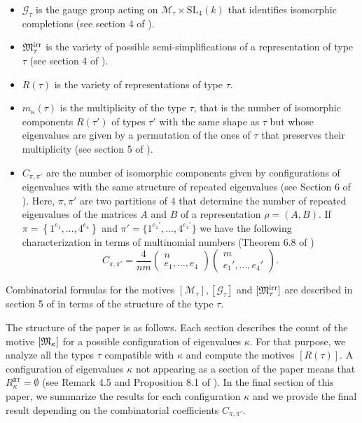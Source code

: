 \documentclass[10pt,a4paper]{amsart}
\begin{document}
\begin{itemize}
	\item $\mathcal{G}_{\tau}$ is the gauge group acting on $\mathcal{M}_{\tau} \times \mathrm{SL}_{4}(k)$ that identifies isomorphic completions (see section 4 of \cite{GPM}).
	\item ${\frak M}_{\tau}^{\textrm{irr}}$ is the variety of possible semi-simplifications of a representation of type $\tau$ (see section 4 of \cite{GPM}).
	\item $R(\tau)$ is the variety of representations of type $\tau$.
	\item $m_{\kappa}(\tau)$ is the multiplicity of the type $\tau$, that is the number of isomorphic components $R(\tau')$ of types $\tau'$ with the same shape as $\tau$ but whose eigenvalues are given by a permutation of the ones of $\tau$ that preserves their multiplicity (see section 5 of \cite{GPM}).
	\item $C_{\pi, \pi'}$ are the number of isomorphic components given by configurations of eigenvalues with the same structure of repeated eigenvalues (see Section 6 of \cite{GPM}). Here, $\pi, \pi'$ are two partitions of ${4}$ that determine the number of repeated eigenvalues of the matrices $A$ and $B$ of a representation $\rho = (A,B)$. If $\pi = \left\{1^{e_1}, \ldots, {4}^{e_{4}}\right\}$ and $\pi' = \big\{1^{e_1'}, \ldots, {4}^{e_{4}'}\big\}$ we have the following characterization in terms of multinomial numbers (Theorem 6.8 of \cite{GPM})
	$$
		C_{\pi, \pi'} = \frac{{4}}{nm} \begin{pmatrix}
	n\\
	e_1, \ldots, e_{4} \end{pmatrix}\begin{pmatrix}
	m\\
	e_1', \ldots, e_{4}'\end{pmatrix}.
	$$
\end{itemize}

Combinatorial formulas for the motives $[\mathcal{M}_{\tau}],[\mathcal{G}_{\tau}]$ and $[{\frak M}_{\tau}^{\textrm{irr}}]$ are described in section 5 of \cite{GPM} in terms of the structure of the type $\tau$.

The structure of the paper is as follows. Each section describes the count of the motive $[{\frak M}_\kappa]$ for a possible configuration of eigenvalues $\kappa$. For that purpose, we analyze all the types $\tau$ compatible with $\kappa$ and compute the motives $[R(\tau)]$. A configuration of eigenvalues $\kappa$ not appearing as a section of the paper means that $R^{\textrm{irr}}_\kappa = \emptyset$ (see Remark {4}.5 and Proposition 8.1 of \cite{GPM}). In the final section of this paper, we summarize the results for each configuration $\kappa$ and we provide the final result depending on the combinatorial coefficients $C_{\pi, \pi'}$.
\end{document}
